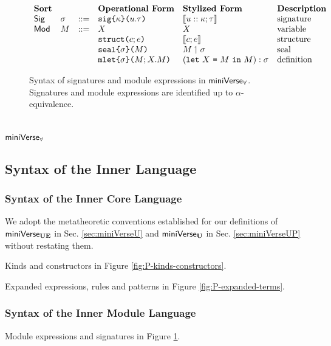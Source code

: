 \begin{figure}[p] 
$\begin{array}{lllllll}
\textbf{Sort} & & & \textbf{Operational Form} & \textbf{Stylized Form} & \textbf{Description}\\
\mathsf{Sig} & \sigma & ::= & \texttt{sig}\texttt{\{}\kappa\texttt{\}(}u.\tau\texttt{)} & \llbracket u :: \kappa; \tau \rrbracket & \text{signature}\\
\mathsf{Mod} & M & ::= & X & X & \text{variable}\\
&&& \texttt{struct}\texttt{(}c; e\texttt{)} & \llbracket c; e \rrbracket & \text{structure}\\
&&& \texttt{seal}\texttt{\{}\sigma\texttt{\}(}M\texttt{)} & M \upharpoonleft \sigma & \text{seal}\\
&&& \texttt{mlet}\texttt{\{}\sigma\texttt{\}(}M; X.M\texttt{)} & (\texttt{let}~X~\texttt{=}~M~\texttt{in}~M) : \sigma & \text{definition}
\end{array}$
\caption[Syntax of signatures and module expressions in $\miniVerseParam$]{Syntax of signatures and module expressions in $\miniVerseParam$. Signatures and module expressions are identified up to $\alpha$-equivalence.}
\label{fig:P-modules-signatures}
\end{figure}

\section{\texorpdfstring{$\miniVerseParam$}{miniVerseForall}}\label{sec:miniVerseP}
\subsection{Syntax of the Inner Language}


\subsubsection{Syntax of the Inner Core Language}
We adopt the metatheoretic conventions established for our definitions of $\mathsf{miniVerse}_\textbf{UE}$ in Sec. \ref{sec:miniVerseU} and $\mathsf{miniVerse}_\textbf{U}$ in Sec. \ref{sec:miniVerseUP} without restating them. 

Kinds and constructors in Figure \ref{fig:P-kinds-constructors}.

Expanded expressions, rules and patterns in Figure \ref{fig:P-expanded-terms}.

\subsubsection{Syntax of the Inner Module Language}
Module expressions and signatures in Figure \ref{fig:P-modules-signatures}.

